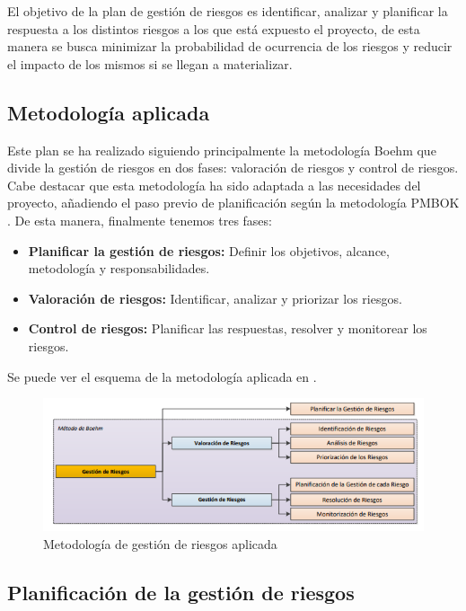 El objetivo de la plan de gestión de riesgos es identificar, analizar y planificar la respuesta a los distintos riesgos a los que está expuesto el proyecto, de esta manera se busca minimizar la probabilidad de ocurrencia de los riesgos y reducir el impacto de los mismos si se llegan a materializar.
\subsection*{Metodología aplicada}
Este plan se ha realizado siguiendo principalmente la metodología Boehm \cite{boehm1991} que divide la gestión de riesgos en dos fases: valoración de riesgos y control de riesgos. Cabe destacar que esta metodología ha sido adaptada a las necesidades del proyecto, añadiendo el paso previo de planificación según la metodología PMBOK \cite{pmbok2013}. De esta manera, finalmente tenemos tres fases:

\begin{itemize}
    \item \textbf{Planificar la gestión de riesgos:} Definir los objetivos, alcance, metodología y responsabilidades.
    \item \textbf{Valoración de riesgos:} Identificar, analizar y priorizar los riesgos.
    \item \textbf{Control de riesgos:} Planificar las respuestas, resolver y monitorear los riesgos.
\end{itemize}

Se puede ver el esquema de la metodología aplicada en .

\begin{figure}[H]
    \hypertarget{fig:A1_PGR_metodologia}{}
    \centering
    \includegraphics[width=0.8\linewidth]{figures/A1_PGR_metodologia.png}
    \caption{Metodología de gestión de riesgos aplicada}
    \label{fig:A1_PGR_metodologia}
\end{figure}

\subsection*{Planificación de la gestión de riesgos}
